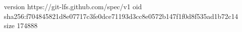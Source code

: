 version https://git-lfs.github.com/spec/v1
oid sha256:f704845821d8e07717c3fe0dce71193d3cc8e0572b147f1f0d8f535ad1b72c14
size 174888
